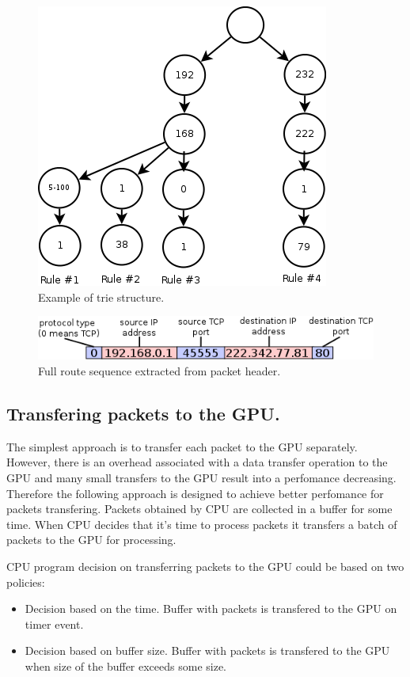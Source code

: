 \documentclass[thesis=M,english]{FITthesis}[2011/07/15]
\begin{document}
\begin{figure}[h]
\centering
\includegraphics[scale=0.6]{images/trie.png}
\caption{Example of trie structure.}
\label{fig:trie_example}
\end{figure}

\begin{figure}[h]
\centering
\includegraphics[scale=0.8]{images/route_sequence.png}
\caption{Full route sequence extracted from packet header.}
\label{fig:route_sequence}
\end{figure}

\subsection*{Transfering packets to the GPU.}
The simplest approach is to transfer each packet to the GPU separately. However, there is an overhead associated with a data transfer operation to the GPU and many small transfers to the GPU result into a perfomance decreasing. Therefore the following approach is designed to achieve better perfomance for packets transfering. Packets obtained by CPU are collected in a buffer for some time. When CPU decides that it's time to process packets it transfers a batch of packets to the GPU for processing. 

CPU program decision on transferring packets to the GPU could be based on two policies:
\begin{itemize}
\item Decision based on the time. Buffer with packets is transfered to the GPU on timer event.
\item Decision based on buffer size. Buffer with packets is transfered to the GPU when size of the buffer exceeds some size.
\end{itemize}
\end{document}
